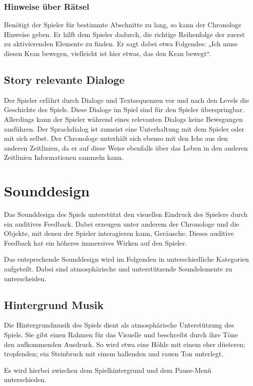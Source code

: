 \subsubsection{Hinweise über Rätsel}
Benötigt der Spieler für bestimmte Abschnitte zu lang, so kann der Chronologe Hinweise geben. Er hilft dem Spieler dadurch, die richtige Reihenfolge der zuerst zu aktivierenden Elemente zu finden. Er sagt dabei etwa Folgendes: „Ich muss diesen Kran bewegen, vielleicht ist hier etwas, das den Kran bewegt“. 

\subsection{Story relevante Dialoge}
Der Spieler erfährt durch Dialoge und Textsequenzen vor und nach den Levels die Geschichte des Spiels. Diese Dialoge im Spiel sind für den Spieler überspringbar. Allerdings kann der Spieler während eines relevanten Dialogs keine Bewegungen ausführen. Der Sprachdialog ist zumeist eine Unterhaltung mit dem Spieler oder mit sich selbst. Der Chronologe unterhält sich ebenso mit den Ichs aus den anderen Zeitlinien, da er auf diese Weise ebenfalls über das Leben in den anderen Zeitlinien Informationen sammeln kann.
\section{Sounddesign}
Das Sounddesign des Spiels unterstützt den visuellen Eindruck des Spielers durch ein auditives Feedback. Dabei erzeugen unter anderem der Chronologe und die Objekte, mit denen der Spieler interagieren kann, Geräusche. Dieses auditive Feedback hat ein höheres immersives Wirken auf den Spieler.

Das entsprechende Sounddesign wird im Folgenden in unterschiedliche Kategorien aufgeteilt. Dabei sind atmosphärische und unterstützende Soundelemente zu unterscheiden.

\subsection{Hintergrund Musik}
Die Hintergrundmusik des Spiels dient als atmosphärische Unterstützung des Spiels. Sie gibt einen Rahmen für das Visuelle und beschreibt durch ihre Töne den aufkommenden Ausdruck. So wird etwa eine Höhle mit einem eher düsteren; tropfenden; ein Steinbruch mit einem hallenden und rauen Ton unterlegt.

Es wird hierbei zwischen dem Spielhintergrund und dem Pause-Menü unterschieden.

